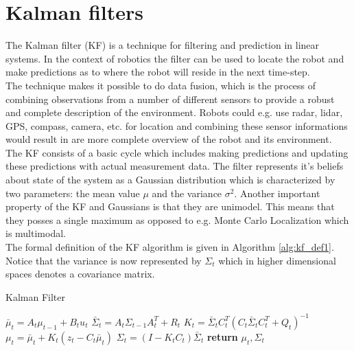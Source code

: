 
\section{Kalman filters}

The Kalman filter (KF) is a technique for filtering and prediction in linear systems. In the context of robotics the filter can be used to locate the robot and make predictions as to where the robot will reside in the next time-step.\\

The technique makes it possible to do data fusion, which is the process of combining observations from a number of different sensors to provide a robust and complete description of the environment. Robots could e.g. use radar, lidar, GPS, compass, camera, etc. for location and combining these sensor informations would result in are more complete overview of the robot and its environment.\\

The KF consists of a basic cycle which includes making predictions and updating these predictions with actual measurement data. The filter represents it's beliefs about state of the system as a Gaussian distribution which is characterized by two parameters: the mean value $\mu$ and the variance $\sigma^2$. Another important property of the KF and Gaussians is that they are unimodel. This means that they posses a single maximum as opposed to e.g. Monte Carlo Localization which is multimodal.\\

The formal definition of the KF algorithm is given in Algorithm \ref{alg:kf_def1}. Notice that the variance is now represented by $\Sigma_{t}$ which in higher dimensional spaces denotes a covariance matrix.

\begin{center}
\begin{minipage}{.65\linewidth}
\begin{algorithm}[H]
\caption{Kalman Filter}
\label{alg:kf_def1}
\begin{algorithmic}[1]
  \State $\bar\mu_{t} = A_{t}\mu_{t-1} + B_{t}u_{t}$%
  \State $\bar\Sigma_{t} = A_{t}\Sigma_{t-1}A_{t}^T + R_{t}$
  \State $K_{t} = \bar\Sigma_{t}C_{t}^T(C_{t}\bar{\Sigma}_{t}C_{t}^T+Q_{t})^{-1}$
  \State $\mu_{t} = \bar\mu_{t} + K_{t}(z_{t} - C_{t}\bar\mu_{t})$
  \State $\Sigma_{t} = (I - K_{t}C_{t})\bar\Sigma_{t}$
  \State \textbf{return} $\mu_{t}, \Sigma_{t}$
\EndProcedure
\end{algorithmic}
\end{algorithm}
\end{minipage}
\end{center}

